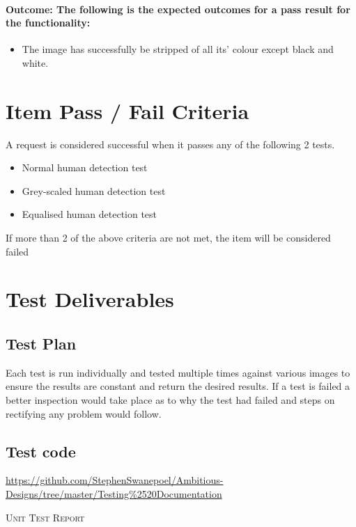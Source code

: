 \documentclass[a4paper,12pt]{report}
\begin{document}
	\paragraph{Outcome: The following is the expected outcomes for a pass result for the functionality:}
	\begin{itemize}
		\item The image has successfully be stripped of all its' colour except black and white.
	\end{itemize}
		
\section{Item Pass / Fail Criteria}
	A request is considered successful when it passes any of the following 2 tests.
	\begin {itemize}
		\item Normal human detection test
		\item Grey-scaled human detection test
		\item Equalised human detection test
	\end {itemize}
	If more than 2 of the above criteria are not met, the item will be considered failed
	
\section{Test Deliverables}
	\subsection {Test Plan}
		Each test is run individually and tested multiple times against various images to ensure the results are constant and return the desired results. If a test is failed a better inspection would take place as to why the test had failed and steps on rectifying any problem would follow.
		
	\subsection {Test code}
		\href{url}{https://github.com/StephenSwanepoel/Ambitious-Designs/tree/master/Testing\%2520Documentation}  
	
\newpage
\begin{center}
	\textsc{\LARGE Unit Test Report}\\[1.5cm]
\end{center}
\end{document}
